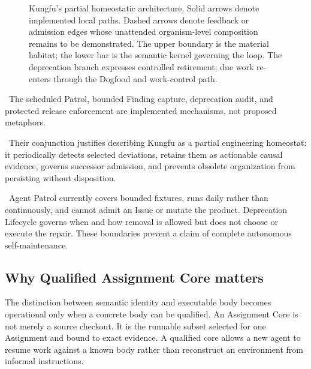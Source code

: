 \begin{figure}[htbp]
\caption{Kungfu's partial homeostatic architecture. Solid arrows denote
implemented local paths. Dashed arrows denote feedback or admission edges
whose unattended organism-level composition remains to be demonstrated.
The upper boundary is the material habitat; the lower bar is the semantic
kernel governing the loop. The deprecation branch expresses controlled
retirement; due work re-enters through the Dogfood and work-control path.}
\label{fig:kungfu-homeostasis}
\end{figure}

\factlabel\ The scheduled Patrol, bounded Finding capture, deprecation audit,
and protected release enforcement are implemented mechanisms, not proposed
metaphors.

\inferencelabel\ Their conjunction justifies describing Kungfu as a partial
engineering homeostat: it periodically detects selected deviations, retains
them as actionable causal evidence, governs successor admission, and prevents
obsolete organization from persisting without disposition.

\nonclaimlabel\ Agent Patrol currently covers bounded fixtures, runs daily
rather than continuously, and cannot admit an Issue or mutate the product.
Deprecation Lifecycle governs when and how removal is allowed but does not
choose or execute the repair. These boundaries prevent a claim of complete
autonomous self-maintenance.

\subsection{Why Qualified Assignment Core matters}

The distinction between semantic identity and executable body becomes
operational only when a concrete body can be qualified. An Assignment Core is
not merely a source checkout. It is the runnable subset selected for one
Assignment and bound to exact evidence. A qualified core allows a new agent to
resume work against a known body rather than reconstruct an environment from
informal instructions.

